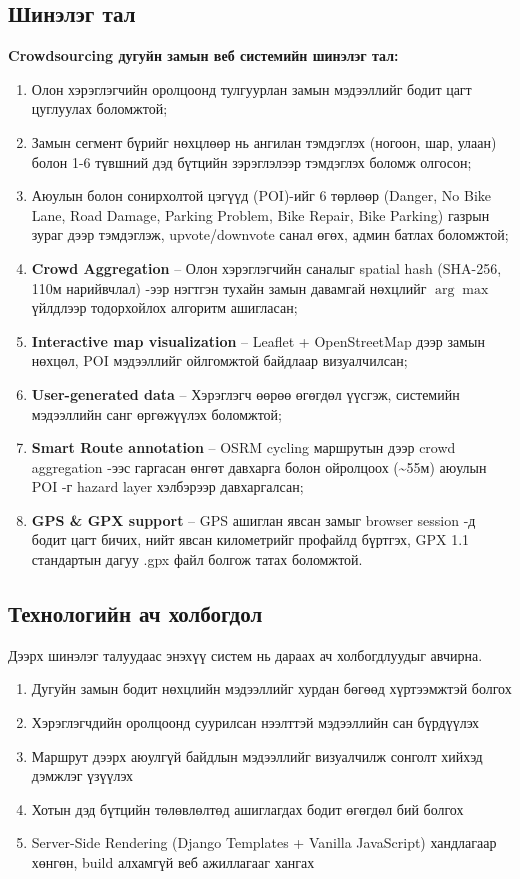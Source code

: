     \subsection*{Шинэлэг тал}
    \textbf{Crowdsourcing дугуйн замын веб системийн шинэлэг тал:}
        \begin{enumerate}[itemsep=0mm]
            \item Олон хэрэглэгчийн оролцоонд тулгуурлан замын мэдээллийг бодит цагт цуглуулах боломжтой;
            \item Замын сегмент бүрийг нөхцлөөр нь ангилан тэмдэглэх (ногоон, шар, улаан) болон 1-6 түвшний дэд бүтцийн зэрэглэлээр тэмдэглэх боломж олгосон;
            \item Аюулын болон сонирхолтой цэгүүд (POI)-ийг 6 төрлөөр (Danger, No Bike Lane, Road Damage, Parking Problem, Bike Repair, Bike Parking) газрын зураг дээр тэмдэглэж, upvote/downvote санал өгөх, админ батлах боломжтой;
            \item \textbf{Crowd Aggregation} -- Олон хэрэглэгчийн саналыг spatial hash (SHA-256, 110м нарийвчлал) -ээр нэгтгэн тухайн замын давамгай нөхцлийг $\arg\max$ үйлдлээр тодорхойлох алгоритм ашигласан;
            \item \textbf{Interactive map visualization} -- Leaflet + OpenStreetMap дээр замын нөхцөл, POI мэдээллийг ойлгомжтой байдлаар визуалчилсан;
            \item \textbf{User-generated data} -- Хэрэглэгч өөрөө өгөгдөл үүсгэж, системийн мэдээллийн санг өргөжүүлэх боломжтой;
            \item \textbf{Smart Route annotation} -- OSRM cycling маршрутын дээр crowd aggregation -ээс гаргасан өнгөт давхарга болон ойролцоох (\textasciitilde 55м) аюулын POI -г hazard layer хэлбэрээр давхаргалсан;
            \item \textbf{GPS \& GPX support} -- GPS ашиглан явсан замыг browser session -д бодит цагт бичих, нийт явсан километрийг профайлд бүртгэх, GPX 1.1 стандартын дагуу .gpx файл болгож татах боломжтой.
        \end{enumerate}

    \subsection*{Технологийн ач холбогдол}
         Дээрх шинэлэг талуудаас энэхүү систем нь дараах ач холбогдлуудыг авчирна.
                 \begin{enumerate}[itemsep=0mm]
            \item Дугуйн замын бодит нөхцлийн мэдээллийг хурдан бөгөөд хүртээмжтэй болгох
            \item Хэрэглэгчдийн оролцоонд суурилсан нээлттэй мэдээллийн сан бүрдүүлэх
            \item Маршрут дээрх аюулгүй байдлын мэдээллийг визуалчилж сонголт хийхэд дэмжлэг үзүүлэх
            \item Хотын дэд бүтцийн төлөвлөлтөд ашиглагдах бодит өгөгдөл бий болгох
            \item Server-Side Rendering (Django Templates + Vanilla JavaScript) хандлагаар хөнгөн, build алхамгүй веб ажиллагааг хангах
        \end{enumerate}

